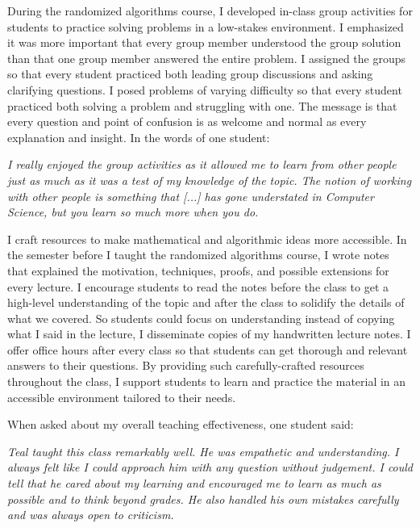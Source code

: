 \documentclass[11pt]{article}
\begin{document}
During the randomized algorithms course, I developed in-class group activities for students to practice solving problems in a low-stakes environment.
I emphasized it was more important that every group member understood the group solution than that one group member answered the entire problem.
I assigned the groups so that every student practiced both leading group discussions and asking clarifying questions.
I posed problems of varying difficulty so that every student practiced both solving a problem and struggling with one.
The message is that every question and point of confusion is as welcome and normal as every explanation and insight.
In the words of one student:
\begin{displayquote}
	\textit{I really enjoyed the group activities as it allowed me to learn from other people just as much as it was a test of my knowledge of the topic. The notion of working with other people is something that [...] %
	has gone understated in Computer Science, but you learn so much more when you do.}
\end{displayquote}

I craft resources to make mathematical and algorithmic ideas more accessible.
In the semester before I taught the randomized algorithms course, I wrote notes that explained the motivation, techniques, proofs, and possible extensions for every lecture.
I encourage students to read the notes before the class to get a high-level understanding of the topic and after the class to solidify the details of what we covered.
So students could focus on understanding instead of copying what I said in the lecture, I disseminate copies of my handwritten lecture notes.
I offer office hours after every class so that students can get thorough and relevant answers to their questions.
By providing such carefully-crafted resources throughout the class, I support students to learn and practice the material in an accessible environment tailored to their needs.

When asked about my overall teaching effectiveness, one student said:
\begin{displayquote}
	\textit{Teal taught this class remarkably well. He was empathetic and understanding. I always felt like I could approach him with any question without judgement. I could tell that he cared about my learning and encouraged me to learn as much as possible and to think beyond grades. He also handled his own mistakes carefully and was always open to criticism. %
	}
\end{displayquote}
\end{document}

